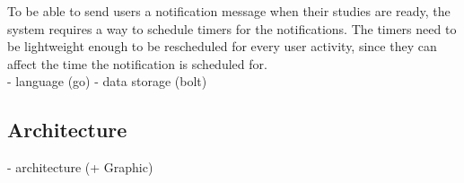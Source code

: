 To be able to send users a notification message when their studies are ready,
the system requires a way to schedule timers for the notifications.
The timers need to be lightweight enough to be rescheduled for every user activity,
since they can affect the time the notification is scheduled for.
\\


- language (go)
- data storage (bolt)


\subsection{Architecture}

- architecture (+ Graphic)
